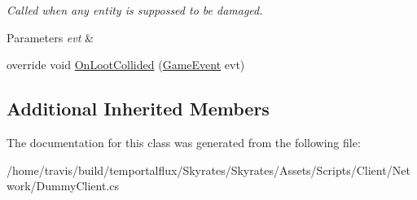 \begin{DoxyCompactItemize}
\begin{DoxyCompactList}\small\item\em Called when any entity is suppossed to be damaged. 


\begin{DoxyParams}{Parameters}
{\em evt} & \\
\hline
\end{DoxyParams}
 \end{DoxyCompactList}\item 
\hypertarget{class_skyrates_1_1_client_1_1_network_1_1_dummy_client_a1ca4a5e98b0be1ebe674345380debcc9}{override void \hyperlink{class_skyrates_1_1_client_1_1_network_1_1_dummy_client_a1ca4a5e98b0be1ebe674345380debcc9}{On\-Loot\-Collided} (\hyperlink{class_skyrates_1_1_client_1_1_game_1_1_event_1_1_game_event}{Game\-Event} evt)}\label{class_skyrates_1_1_client_1_1_network_1_1_dummy_client_a1ca4a5e98b0be1ebe674345380debcc9}

\end{DoxyCompactItemize}
\subsection*{Additional Inherited Members}


The documentation for this class was generated from the following file\-:\begin{DoxyCompactItemize}
\item 
/home/travis/build/temportalflux/\-Skyrates/\-Skyrates/\-Assets/\-Scripts/\-Client/\-Network/Dummy\-Client.\-cs\end{DoxyCompactItemize}
